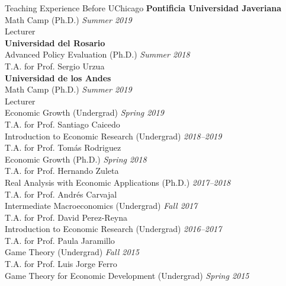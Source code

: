 \documentclass{resume} %
\begin{document}
	\pagebreak
	\begin{rSection}{Teaching Experience Before UChicago}
		\textbf{Pontificia Universidad Javeriana}\\
		Math Camp (Ph.D.) \hfill {\em Summer 2019}\\[-0.25em]
		{\small Lecturer}\\[0.35em]
		\textbf{Universidad del Rosario}\\
		Advanced Policy Evaluation (Ph.D.) \hfill {\em Summer 2018}\\[-0.25em]
		{\small T.A. for Prof. Sergio Urzua}\\[0.35em]
		\textbf{Universidad de los Andes}\\
		Math Camp (Ph.D.) \hfill {\em Summer 2019}\\[-0.25em]
		{\small Lecturer}\\[0.35em]
		Economic Growth (Undergrad) \hfill {\em Spring 2019}\\[-0.25em]
		{\small T.A. for Prof. Santiago Caicedo}\\[0.35em]
		Introduction to Economic Research (Undergrad) \hfill {\em 2018--2019}\\[-0.25em]
		{\small T.A. for Prof. Tomás Rodriguez}\\[0.35em]
		Economic Growth (Ph.D.) \hfill {\em Spring 2018}\\[-0.25em]
		{\small T.A. for Prof. Hernando Zuleta}\\[0.35em]
		Real Analysis with Economic Applications (Ph.D.) \hfill {\em 2017--2018}\\[-0.25em]
		{\small T.A. for Prof. Andrés Carvajal}\\[0.35em]
		Intermediate Macroeconomics (Undergrad) \hfill {\em Fall 2017}\\[-0.25em]
		{\small T.A. for Prof. David Perez-Reyna}\\[0.35em]
		Introduction to Economic Research (Undergrad) \hfill {\em 2016--2017}\\[-0.25em]
		{\small T.A. for Prof. Paula Jaramillo}\\[0.35em]
		Game Theory (Undergrad) \hfill {\em Fall 2015}\\[-0.25em]
		{\small T.A. for Prof. Luis Jorge Ferro}\\[0.35em]
		Game Theory for Economic Development (Undergrad) \hfill {\em Spring 2015}\\[-0.25em]

\end{rSection}
\end{document}
